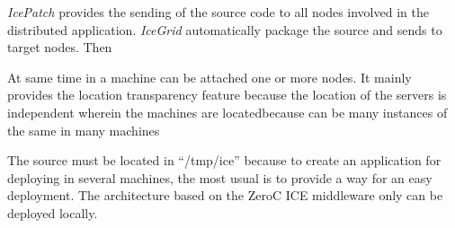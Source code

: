 \emph{IcePatch} provides the sending of the source code to all nodes involved in
the distributed application. \emph{IceGrid} automatically package the source and
sends to target nodes. Then

 At same time in a machine can be attached one or more
nodes. It mainly provides the location transparency feature because the location
of the servers is independent wherein the machines are locatedbecause can be many instances
of the same in many machines


The source must be located in ``/tmp/ice'' because to create an application for
deploying in several machines, the most usual is to provide a way for an easy
deployment. 
The architecture based on the ZeroC ICE middleware only can be deployed
locally.  
